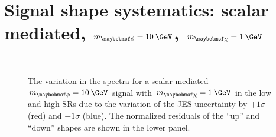 \clearpage 

\section{Signal shape systematics: scalar mediated, $\mMed=10\:\GeV$, $\mDM=1\:\GeV$} 
\label{sec:s10syst}

\begin{figure}[h]
  \centering
   \\
  \caption{The variation in the \ptmiss spectra for a scalar mediated $\mMed=10\:\GeV$ signal with $\mDM=1\:\GeV$ in the low and high \mttll SRs due to the variation of the JES uncertainty by $+1\sigma$ (red) and $-1\sigma$ (blue). The normalized residuals of the ``up'' and ``down'' shapes are shown in the lower panel.}
  \label{fig:JESshape}
\end{figure}

